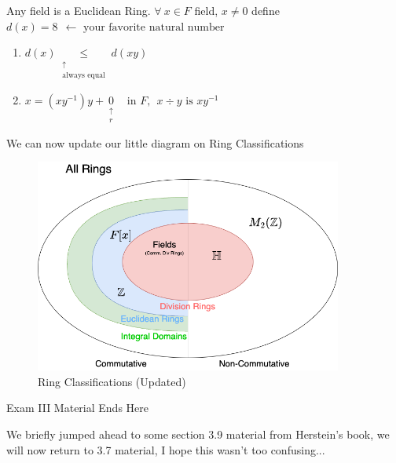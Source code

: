 \begin{example}
    Any field is a Euclidean Ring. $\forall \ x \in F$ field, $x\neq 0$ define $d(x)=8 \ \ \leftarrow \text{ your favorite natural number}$
    \begin{enumerate}
        \item $d(x) \underset{\substack{\uparrow \\ \text{always equal}}}{\leq} d(xy)$
        \item $x=(xy^{-1})y +\underset{\substack{\uparrow \\ r}}{0} \ \ \ \text{ in }F, \ \ x\div y \text{ is }xy^{-1}$
    \end{enumerate}
\end{example}
\noindent We can now update our little diagram on Ring Classifications
\begin{figure}[h!]
    \centering
    \includegraphics[width=0.9\textwidth]{Figures/RingClassifications_Euclidean.png}
    \caption{Ring Classifications (Updated)}
    \label{fig:ring-classifications-eucl}
\end{figure}
\begin{tcolorbox}
    \begin{center}
        Exam III Material Ends Here
    \end{center}
\end{tcolorbox}
\begin{tcolorbox}
    We briefly jumped ahead to some section 3.9 material from Herstein's book, we will now return to 3.7 material, I hope this wasn't too confusing...
\end{tcolorbox}
\newpage

\setcounter{section}{6}
